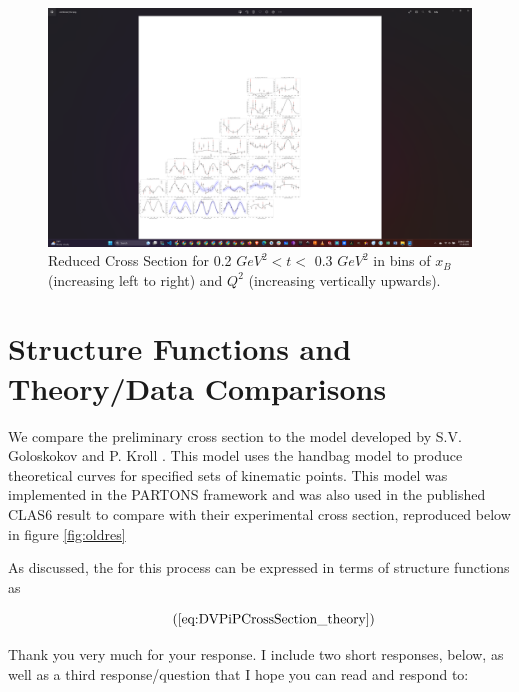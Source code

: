 \begin{figure}[ht]
\centering
\includegraphics[trim={14.6cm 4cm 27.2cm 4cm},clip,width=\textwidth]{Chapters/Ch4-BaseAnalysis/bin_by_bin_cross_sections/pics_screenshots/t_2.png}
\caption[Reduced Cross Section for 0.2 $GeV^2 < t <$ 0.3 $ GeV^2$]{Reduced Cross Section for 0.2 $ GeV^2 < t <$ 0.3 $GeV^2$ in bins of $x_B$ (increasing left to right) and $Q^2$ (increasing vertically upwards). }
\label{fig:combined_t0.2}
\end{figure}

\clearpage
\section{Structure Functions and Theory/Data Comparisons}
    We compare the preliminary cross section to the model developed by S.V. Goloskokov and P. Kroll \cite{Goloskokov2010AnElectroproduction}. This model uses the handbag model to produce theoretical curves for specified sets of kinematic points. This model was implemented in the PARTONS framework \cite{Berthou2018PARTONS:Software} and was also used in the published CLAS6 result to compare with their experimental cross section, reproduced below in figure \ref{fig:oldres} \cite{Bedlinskiy2014ExclusiveCLAS}
    
    As discussed, the \xsec for this process can be expressed in terms of structure functions as 
    
        \begin{equation*}
             \recallLabel{eq:DVPiPCrossSection_theory}
        \end{equation*}
    
    
    
    Thank you very much for your response. I include two short responses, below, as well as a third response/question that I hope you can read and respond to: 
    
